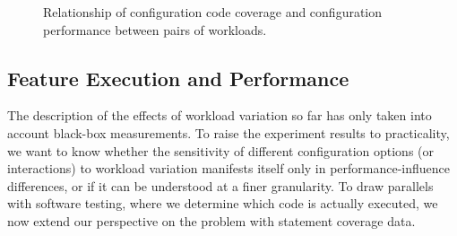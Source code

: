 \begin{figure}
	\centering
	\begin{subfigure}{0.33\textwidth}
		\centering
		\caption{\batik}
	\end{subfigure}
	\begin{subfigure}{0.33\textwidth}
		\centering
		\caption{\dconvert}
	\end{subfigure}
	\begin{subfigure}{0.33\textwidth}
		\centering
		\caption{\htwo}
	\end{subfigure}
	\begin{subfigure}{0.33\textwidth}
		\centering
		\caption{\jumper}
	\end{subfigure}
	\begin{subfigure}{0.33\textwidth}
		\centering
		\caption{\jadx}
	\end{subfigure}
	\begin{subfigure}{0.33\textwidth}
		\centering
		\caption{\kanzi}
	\end{subfigure}
	\caption{Relationship of  configuration code coverage and configuration performance between pairs of workloads.}
	\label{fig:diff_performance_distribution}
\end{figure}

\subsection{Feature Execution and Performance}\label{sec:rq3}
The description of the effects of workload variation so far has only taken into account black-box measurements. To raise the experiment results to practicality, we want to know whether the sensitivity of different configuration options (or interactions) to workload variation manifests itself only in performance-influence differences, or if it can be understood at a finer granularity. To draw parallels with software testing, where we determine which code is actually executed, we now extend our perspective on the problem with statement coverage data. 


